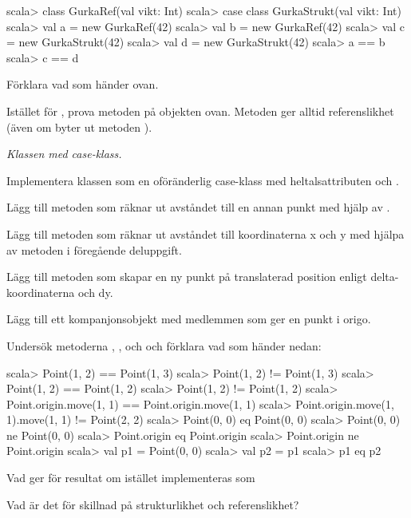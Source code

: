 \begin{REPL}
scala> class GurkaRef(val vikt: Int)
scala> case class GurkaStrukt(val vikt: Int)
scala> val a = new GurkaRef(42)
scala> val b = new GurkaRef(42)
scala> val c = new GurkaStrukt(42)
scala> val d = new GurkaStrukt(42)
scala> a == b
scala> c == d 
\end{REPL}

\Subtask Förklara vad som händer ovan.

\Subtask Istället för \code{==}, prova metoden  på objekten ovan. Metoden  ger alltid referenslikhet (även om byter ut metoden ).

\Task \label{task:Point} \emph{Klassen  med case-klass.} 

\Subtask Implementera klassen  som en oföränderlig case-klass med heltalsattributen  och . 

\Subtask Lägg till metoden  som räknar ut avståndet till en annan punkt med hjälp av .

\Subtask Lägg till metoden  som räknar ut avståndet till koordinaterna x och y med hjälpa av metoden i föregående deluppgift.

\Subtask Lägg till metoden  som skapar en ny punkt på translaterad position enligt delta-koordinaterna  och {dy}.

\Subtask Lägg till ett kompanjonsobjekt med medlemmen  som ger en punkt i origo.

\Subtask Undersök metoderna \code{==}, \code{!=},  och  och förklara vad som händer nedan:
\begin{REPL}
scala> Point(1, 2) == Point(1, 3)
scala> Point(1, 2) != Point(1, 3)
scala> Point(1, 2) == Point(1, 2)
scala> Point(1, 2) != Point(1, 2)
scala> Point.origin.move(1, 1) == Point.origin.move(1, 1)
scala> Point.origin.move(1, 1).move(1, 1) != Point(2, 2)
scala> Point(0, 0) eq Point(0, 0)
scala> Point(0, 0) ne Point(0, 0)
scala> Point.origin eq Point.origin
scala> Point.origin ne Point.origin
scala> val p1 = Point(0, 0)
scala> val p2 = p1
scala> p1 eq p2
\end{REPL}

\Subtask Vad ger  för resultat om  istället  implementeras som 

\Subtask\Pen Vad är det för skillnad på strukturlikhet och referenslikhet?

